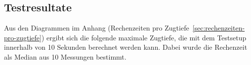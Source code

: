\subsection{Testresultate}
Aus den Diagrammen im Anhang (Rechenzeiten pro Zugtiefe~\ref{sec:rechenzeiten-pro-zugtiefe}) ergibt sich die folgende maximale Zugtiefe, die mit dem Testsetup innerhalb von 10 Sekunden berechnet werden kann.
Dabei wurde die Rechenzeit als Median aus 10 Messungen bestimmt.
\begin{table}[H]
    \centering
    \caption{Maximale Zugtiefe innerhalb von 10 Sekunden}
    \label{tab:maximale-zugtiefe-pro-algorithmus}
\end{table}